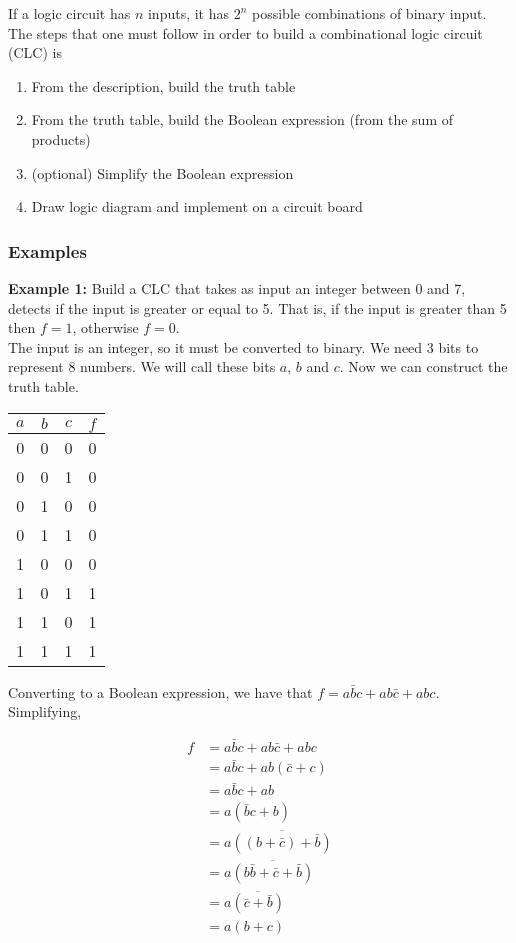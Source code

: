 \documentclass[]{article}
\begin{document}
If a logic circuit has $n$ inputs, it has $2^n$ possible combinations of binary input.\\

The steps that one must follow in order to build a combinational logic circuit (CLC) is
\begin{enumerate}
	\item From the description, build the truth table
	\item From the truth table, build the Boolean expression (from the sum of products)
	\item (optional) Simplify the Boolean expression
	\item Draw logic diagram and implement on a circuit board
\end{enumerate}\bigbreak

\subsubsection{Examples}
\bigbreak

\textbf{Example 1:} Build a CLC that takes as input an integer between 0 and 7, detects if the input is greater or equal to 5. That is, if the input is greater than 5 then $f=1$, otherwise $f=0$. \\

The input is an integer, so it must be converted to binary. We need 3 bits to represent 8 numbers. We will call these bits $a$, $b$ and $c$. Now we can construct the truth table.\\

\begin{center}
	\begin{tabular}{|c|c|c||c|}
		$a$ & $b$ & $c$ & $f$ \\\hline
		0 & 0 & 0 & 0\\
		0 & 0 & 1 & 0\\
		0 & 1 & 0 & 0\\
		0 & 1 & 1 & 0\\
		1 & 0 & 0 & 0\\
		1 & 0 & 1 & 1\\
		1 & 1 & 0 & 1\\
		1 & 1 & 1 & 1\\
	\end{tabular}
	\bigbreak
\end{center}

Converting to a Boolean expression, we have that $f = a\bar{b}c + ab\bar{c} +abc$. Simplifying, 

\begin{align*}
	f &= a\bar{b}c + ab\bar{c} +abc\\
	&= a\bar{b}c + ab(\bar{c} + c) \\
	&= a\bar{b}c + ab\\
	&= a(\bar{b}c + b)\\
	&= a\overline{((b+\bar{c}) + \bar{b})}\\
	&= a\overline{(b\bar{b} + \bar{c}+\bar{b})}\\
	&= a\overline{(\bar{c}+\bar{b})}\\
	&= a(b + c)
\end{align*}
\end{document}

